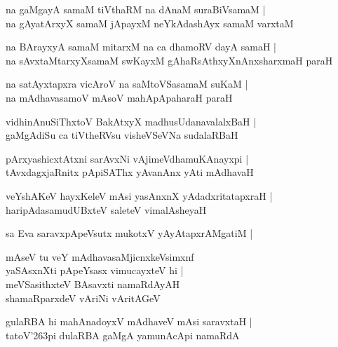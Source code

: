 \documentclass[twoside,12pt,openright]{book}
\def\S{\char'263}
\newcounter{shloka}[chapter]
\begin{document}
\begin{shloka}%
na gaMgayA samaM tiVthaRM na dAnaM suraBiVsamaM |\\
na gAyatArxyX samaM jApayxM neYkAdashAyx samaM varxtaM 
\end{shloka}

\begin{shloka}%
na BArayxyA samaM mitarxM na ca dhamoRV dayA samaH |\\
na sAvxtaMtarxyXsamaM swKayxM gAhaRsAthxyXnAnxsharxmaH paraH
\end{shloka}

\begin{shloka}%
na satAyxtapxra vicAroV na saMtoVSasamaM suKaM |\\
na mAdhavasamoV mAsoV mahApApaharaH paraH 
\end{shloka}

\begin{shloka}%
vidhinAnuSiThxtoV BakAtxyX madhusUdanavalalxBaH |\\
gaMgAdiSu ca tiVtheRVsu visheVSeVNa sudalaRBaH 
\end{shloka}

\begin{shloka}%
pArxyashicxtAtxni sarAvxNi vAjimeVdhamuKAnayxpi |\\
tAvxdagxjaRnitx pApiSAThx yAvanAnx yAti mAdhavaH 
\end{shloka}

\begin{shloka}%
veYshAKeV hayxKeleV mAsi yasAnxnX yAdadxritatapxraH |\\
haripAdasamudUBxteV saleteV vimalAsheyaH 
\end{shloka}

\begin{shloka}%
sa Eva saravxpApeVsutx mukotxV yAyAtapxrAMgatiM |\\
\end{shloka}

\begin{shloka}%
mAseV tu veY mAdhavasaMjicnxkeVsimxnf \\
yaSAsxnXti pApeYsasx vimucayxteV hi |\\
meVSasithxteV  BAsavxti namaRdAyAH \\
shamaRparxdeV vAriNi vAritAGeV 
\end{shloka}

\begin{shloka}%
gulaRBA hi mahAnadoyxV mAdhaveV mAsi saravxtaH |\\
tatoV\S pi dulaRBA gaMgA yamunAcApi namaRdA 
\end{shloka}
\end{document}
